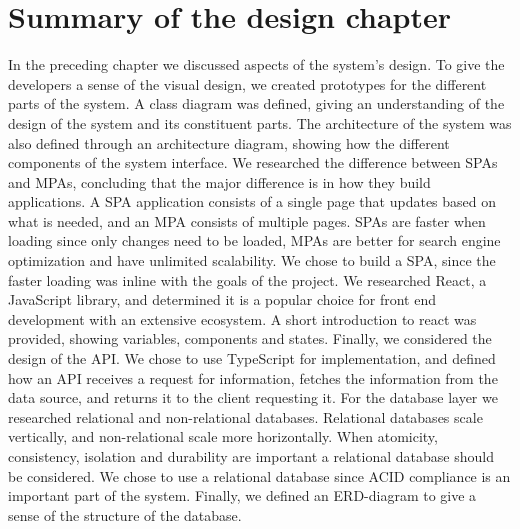 \section{Summary of the design chapter}
In the preceding chapter we discussed aspects of the system's design.
To give the developers a sense of the visual design, we created prototypes for the different parts of the system.
A class diagram was defined, giving an understanding of the design of the system and its constituent parts.
The architecture of the system was also defined through an architecture diagram, showing how the different components of the system interface.
We researched the difference between SPAs and MPAs, concluding that the major difference is in how they build applications.
A SPA application consists of a single page that updates based on what is needed, and an MPA consists of multiple pages.
SPAs are faster when loading since only changes need to be loaded, MPAs are better for search engine optimization and have unlimited scalability.
We chose to build a SPA, since the faster loading was inline with the goals of the project. 
We researched React, a JavaScript library, and determined it is a popular choice for front end development with an extensive ecosystem.
A short introduction to react was provided, showing variables, components and states.
Finally, we considered the design of the API.
We chose to use TypeScript for implementation, and defined how an API receives a request for information, fetches the information from the data source, and returns it to the client requesting it.
For the database layer we researched relational and non-relational databases.
Relational databases scale vertically, and non-relational scale more horizontally.
When atomicity, consistency, isolation and durability are important a relational database should be considered.
We chose to use a relational database since ACID compliance is an important part of the system.
Finally, we defined an ERD-diagram to give a sense of the structure of the database.

